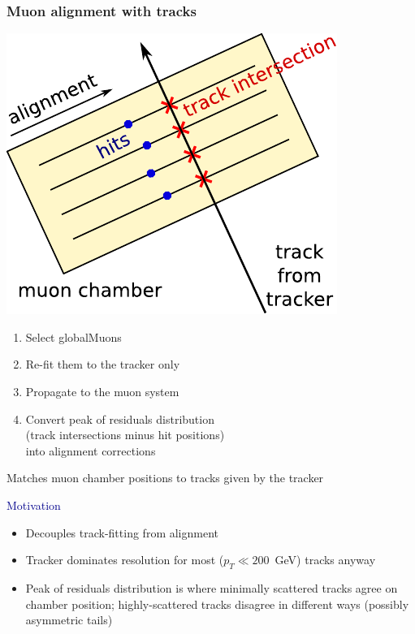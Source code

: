 \documentclass[compress]{beamer}
\begin{document}
\begin{frame}
\frametitle{Muon alignment with tracks}

\vspace{0.5 cm}
\hfill \includegraphics[width=0.35\linewidth]{hip_explanation.pdf}

\vspace{-3.75 cm}
\begin{enumerate}
\item Select globalMuons
\item Re-fit them to the tracker only
\item Propagate to the muon system
\item Convert peak of residuals distribution \\ (track intersections minus hit positions) \\ into alignment corrections
\end{enumerate}

Matches muon chamber positions to tracks given by the tracker

\vspace{0.5 cm}
\hspace{-0.83 cm} \textcolor{darkblue}{\Large Motivation}
\begin{itemize}
\item Decouples track-fitting from alignment
\item Tracker dominates resolution for most ($p_T \ll 200$~GeV) tracks anyway
\item Peak of residuals distribution is where minimally scattered tracks agree on chamber position; highly-scattered tracks disagree in different ways (possibly asymmetric tails)
\end{itemize}
\end{frame}
\end{document}
